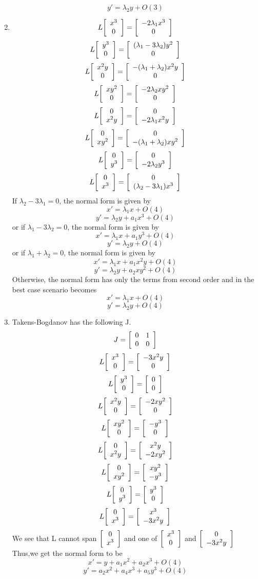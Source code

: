 \documentclass[a4paper,11pt]{article}
\newenvironment{mat}{\left[ \begin{array}{ccccccccccccc}}{\end{array}\right]}
\newcommand\bcm{\begin{mat}}
\newcommand\ecm{\end{mat}}
\begin{document}
\begin{enumerate}
\[   y'= \lambda_2 y+ O(3)\]
\item
\[L\bcm x^3\\0 \ecm = \bcm -2\lambda_1 x^3\\0 \ecm  \]
\[L\bcm y^3\\0 \ecm = \bcm (\lambda_1 -3\lambda_2) y^2\\0 \ecm  \]
\[L\bcm x^2y\\0\ecm = \bcm -(\lambda_1+\lambda_2)x^2y\\0 \ecm  \]
\[L\bcm xy^2\\0\ecm = \bcm -2\lambda_2 xy^2\\0 \ecm  \]
\[L\bcm 0\\x^2y\ecm = \bcm  0\\-2\lambda_1x^2y \ecm  \]
\[L\bcm 0\\xy^2\ecm = \bcm  0\\-(\lambda_1+\lambda_2)xy^2 \ecm  \]
\[L\bcm 0\\y^3\ecm = \bcm  0\\-2\lambda_2y^3 \ecm  \]
\[L\bcm 0\\x^3\ecm = \bcm  0\\(\lambda_2 -3\lambda_1) x^3 \ecm  \]
If $\lambda_2 -3\lambda_1=0$, the normal form is given by
\[   x'= \lambda_1 x+ O(4)\]
\[   y'= \lambda_2 y+ a_1 x^3+ O(4)\]
or if $\lambda_1 -3\lambda_2=0$, the normal form is given by
\[   x'= \lambda_1 x+a_1 y^3+ O(4)\]
\[   y'= \lambda_2 y+ O(4)\]
or if $\lambda_1 +\lambda_2=0$, the normal form is given by
\[   x'= \lambda_1 x+a_1 x^2y+ O(4)\]
\[   y'= \lambda_2 y+a_2 xy^2+ O(4)\]
Otherwise, the normal form has only the terms from second order and in the best case scenario becomes 
\[   x'= \lambda_1 x+ O(4)\]
\[   y'= \lambda_2 y+ O(4)\]
\item
Takens-Bogdanov has the following J.
\[J = \bcm 0 &1\\0&0\ecm\]
\[L\bcm x^3\\0 \ecm = \bcm -3x^2y\\0 \ecm  \]
\[L\bcm y^3\\0 \ecm = \bcm 0\\0 \ecm  \]
\[L\bcm x^2y\\0\ecm = \bcm -2xy^2\\0 \ecm  \]
\[L\bcm xy^2\\0\ecm = \bcm -y^3\\0 \ecm  \]
\[L\bcm 0\\x^2y\ecm = \bcm  x^2y\\-2xy^2 \ecm  \]
\[L\bcm 0\\xy^2\ecm = \bcm  xy^2\\-y^3 \ecm  \]
\[L\bcm 0\\y^3\ecm =  \bcm  y^3\\0 \ecm\]
\[L\bcm 0\\x^3\ecm =  \bcm  x^3\\-3x^2y \ecm  \]
We see that L cannot span $\bcm 0\\x^3\ecm$ and one of $\bcm x^3\\0\ecm$ and $\bcm 0\\-3x^2y\ecm$   
Thus,we get the normal form to be
\[   x'= y+ a_1x^2+ a_2x^3+O(4)\]
\[   y'= a_2x^2+ a_4x^3+a_5y^3+ O(4)\]

	\end{enumerate} 
\end{document}
